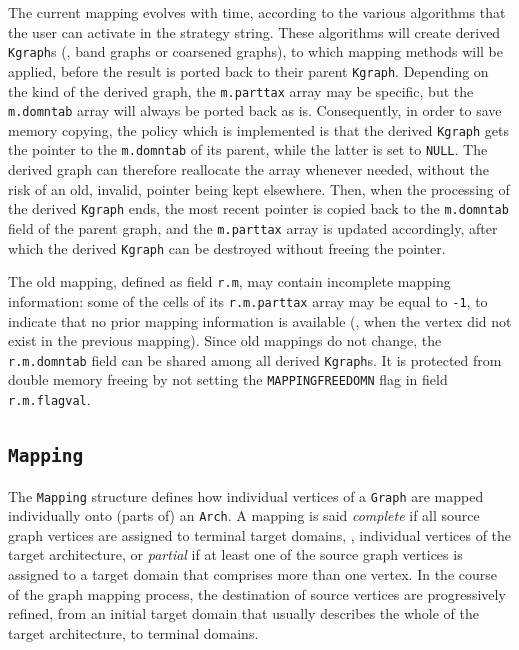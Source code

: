 The current mapping evolves with time, according to the various
algorithms that the user can activate in the strategy string. These
algorithms will create derived \texttt{Kgraph}s (\eg, band graphs or
coarsened graphs), to which mapping methods will be applied, before
the result is ported back to their parent \texttt{Kgraph}. Depending
on the kind of the derived graph, the \texttt{m.parttax} array may be
specific, but the \texttt{m.domntab} array will always be ported back
as is. Consequently, in order to save memory copying, the policy which
is implemented is that the derived \texttt{Kgraph} gets the pointer to
the \texttt{m.domntab} of its parent, while the latter is set to
\texttt{NULL}. The derived graph can therefore reallocate the array
whenever needed, without the risk of an old, invalid, pointer being
kept elsewhere. Then, when the processing of the derived
\texttt{Kgraph} ends, the most recent pointer is copied back to the
\texttt{m.domntab} field of the parent graph, and the
\texttt{m.parttax} array is updated accordingly, after which the
derived \texttt{Kgraph} can be destroyed without freeing the
pointer.

The old mapping, defined as field \texttt{r.m},
may contain incomplete mapping information: some of the cells of its
\texttt{r.m.parttax} array may be equal to \texttt{-1}, to indicate
that no prior mapping information is available (\eg, when the vertex
did not exist in the previous mapping). Since old mappings do not
change, the \texttt{r.m.domntab} field can be shared among all derived
\texttt{Kgraph}s. It is protected from double memory freeing by not
setting the \texttt{MAPPING\lbt FREE\lbt DOMN} flag in field
\texttt{r.m.flagval}.

\subsection{\texttt{Mapping}}
\label{sec-data-mapping}

The \texttt{Mapping} structure defines how individual vertices of a
\texttt{Graph} are mapped individually onto (parts of) an
\texttt{Arch}. A mapping is said \textit{complete} if all source graph
vertices are assigned to terminal target domains, \ie, individual
vertices of the target architecture, or \textit{partial} if at least
one of the source graph vertices is assigned to a target domain that
comprises more than one vertex. In the course of the graph mapping
process, the destination of source vertices are progressively refined,
from an initial target domain that usually describes the whole of the
target architecture, to terminal domains.

